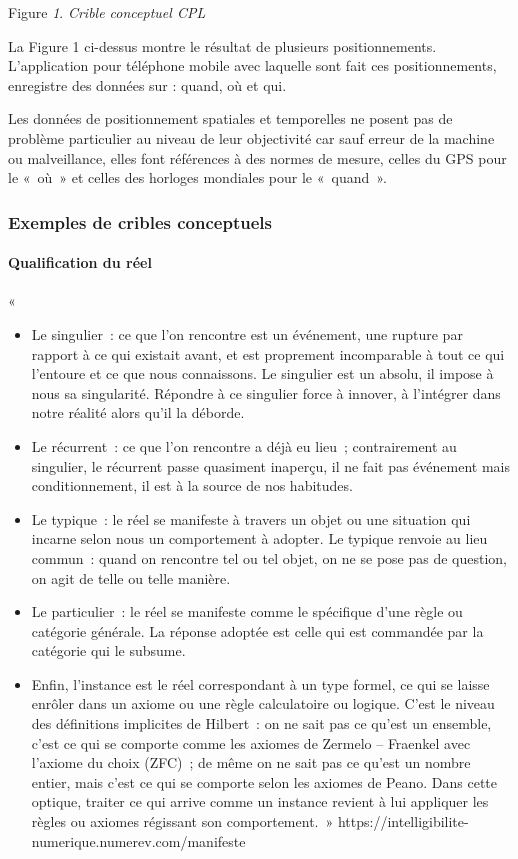 \documentclass[
  a4paper,
  DIV=11,
  numbers=noendperiod]{scrreprt}
\let\oldparagraph\paragraph
\renewcommand{\paragraph}[1]{\oldparagraph{#1}\mbox{}}
\providecommand{\tightlist}{%
  \setlength{\itemsep}{0pt}\setlength{\parskip}{0pt}}\usepackage{longtable,booktabs,array}
\begin{document}
\hfill\break
Figure \emph{1}. \emph{Crible conceptuel CPL}

La Figure 1 ci-dessus montre le résultat de plusieurs positionnements.
L'application pour téléphone mobile avec laquelle sont fait ces
positionnements, enregistre des données sur : quand, où et qui.

Les données de positionnement spatiales et temporelles ne posent pas de
problème particulier au niveau de leur objectivité car sauf erreur de la
machine ou malveillance, elles font références à des normes de mesure,
celles du GPS pour le «~où~» et celles des horloges mondiales pour le
«~quand~».

\subsubsection{Exemples de cribles
conceptuels}\label{exemples-de-cribles-conceptuels}

\paragraph{Qualification du réel}\label{qualification-du-ruxe9el}

«~

\begin{itemize}
\tightlist
\item
  Le singulier~: ce que l'on rencontre est un événement, une rupture par
  rapport à ce qui existait avant, et est proprement incomparable à tout
  ce qui l'entoure et ce que nous connaissons. Le singulier est un
  absolu, il impose à nous sa singularité. Répondre à ce singulier force
  à innover, à l'intégrer dans notre réalité alors qu'il la déborde.~
\item
  Le récurrent~: ce que l'on rencontre a déjà eu lieu~; contrairement au
  singulier, le récurrent passe quasiment inaperçu, il ne fait pas
  événement mais conditionnement, il est à la source de nos habitudes.
\item
  Le typique~: le réel se manifeste à travers un objet ou une situation
  qui incarne selon nous un comportement à adopter. Le typique renvoie
  au lieu commun~: quand on rencontre tel ou tel objet, on ne se pose
  pas de question, on agit de telle ou telle manière.
\item
  Le particulier~: le réel se manifeste comme le spécifique d'une règle
  ou catégorie générale. La réponse adoptée est celle qui est commandée
  par la catégorie qui le subsume.
\item
  Enfin, l'instance est le réel correspondant à un type formel, ce qui
  se laisse enrôler dans un axiome ou une règle calculatoire ou logique.
  C'est le niveau des définitions implicites de Hilbert~: on ne sait pas
  ce qu'est un ensemble, c'est ce qui se comporte comme les axiomes de
  Zermelo -- Fraenkel avec l'axiome du choix (ZFC)~; de même on ne sait
  pas ce qu'est un nombre entier, mais c'est ce qui se comporte selon
  les axiomes de Peano. Dans cette optique, traiter ce qui arrive comme
  un instance revient à lui appliquer les règles ou axiomes régissant
  son comportement.~»
  https://intelligibilite-numerique.numerev.com/manifeste
\end{itemize}
\end{document}

